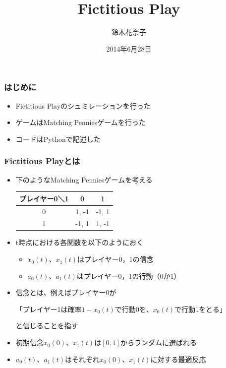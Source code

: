 \documentclass[dvipdfmx,fleqn,jsarticle]{beamer}
\title{\Large Fictitious Play}
\author{\large 鈴木花奈子}
\date{\small 2014年6月28日}
\begin{document}
\sffamily
\gtfamily




\begin{frame}
  \titlepage
  \thispagestyle{empty}
\end{frame}


\setcounter{framenumber}{0}








\begin{frame}
\frametitle{はじめに}
\begin{itemize}\setlength{\parskip}{0.5em}
\item
Fictitious Playのシュミレーションを行った

\item
ゲームはMatching Penniesゲームを行った

\item
コードはPythonで記述した
\end{itemize}
\end{frame}






\begin{frame}
\frametitle{Fictitious Playとは}
\begin{itemize}\setlength{\parskip}{0.5em}
\item
下のようなMatching Penniesゲームを考える

\begin{center}
	\begin{tabular}{|c|c|c|} \hline
		プレイヤー0＼1 & 0 & 1 \\ \hline
		0 &  1, -1 & -1, 1 \\ \hline
		1 & -1, 1 & 1, -1 \\ \hline
	\end{tabular}
\end{center}

\item
t時点における各関数を以下のようにおく
 \begin{itemize}\setlength{\parskip}{0.5em}
 \item
 $x_0(t)$、$x_1(t)$はプレイヤー0，1の信念
 \item
 $a_0(t)$、$a_1(t)$はプレイヤー0，1の行動（0か1）
 \end{itemize}


\item
信念とは、例えばプレイヤー0が

{\footnotesize 「プレイヤー1は確率$1-x_0(t)$で行動0を、$x_0(t)$で行動1をとる」}

と信じることを指す

\item
初期信念$x_0(0)$、$x_1(t)$は$[0, 1]$からランダムに選ばれる

\item
$a_0(t)$、$a_1(t)$はそれぞれ$x_0(0)$、$x_1(t)$に対する最適反応

\end{itemize}
\end{frame}
\end{document}
